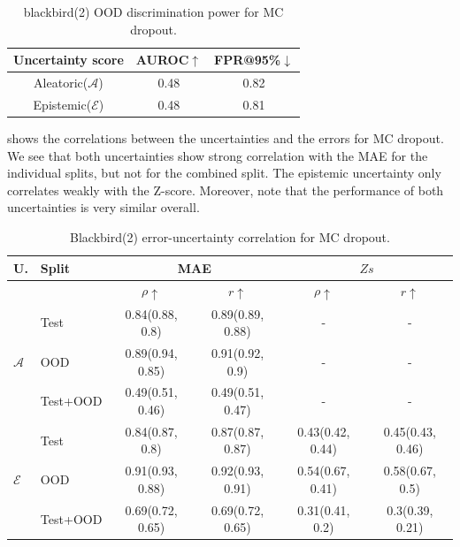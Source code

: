 \begin{table}[h]
\centering
    \begin{tabular}{c  c  c}  
        \toprule
        Uncertainty score & AUROC$\uparrow$ & FPR@95\%$\downarrow$\\
        \midrule
        Aleatoric($\mathcal{A}$) & 0.48  & 0.82\\
        Epistemic($\mathcal{E}$) & 0.48 &  0.81 \\
        \midrule
    \end{tabular}
    \caption{blackbird(2) OOD discrimination power for MC dropout.}
    \label{tbl:bb2_dropout_discrimination}
\end{table}

 shows the correlations between the uncertainties and the errors for MC dropout. We see that both uncertainties show strong correlation with the MAE for the individual splits, but not for the combined split. The epistemic uncertainty only correlates weakly with the Z-score. Moreover, note that the performance of both uncertainties is very similar overall. 


\begin{table}[h]
\centering
    \begin{tabular}{l l c c c c}  
        \toprule
        U. & Split & \multicolumn{2}{c}{MAE} & \multicolumn{2}{c}{$Zs$}\\
        \midrule
        & & $\rho \uparrow$ & $r \uparrow$ & $\rho \uparrow$ & $r \uparrow$ \\
        \multirow{3}{*}{$\mathcal{A}$} 
            & Test     & 0.84(0.88, 0.8) & 0.89(0.89, 0.88) & - & - \\  
            & OOD      & 0.89(0.94, 0.85) & 0.91(0.92, 0.9) & - & - \\  
            & Test+OOD & 0.49(0.51, 0.46) & 0.49(0.51, 0.47) & - & - \\ 

        \midrule
        \multirow{3}{*}{$\mathcal{E}$} 
            & Test     & 0.84(0.87, 0.8)  & 0.87(0.87, 0.87) & 0.43(0.42, 0.44) & 0.45(0.43, 0.46) \\  
            & OOD      & 0.91(0.93, 0.88) & 0.92(0.93, 0.91) & 0.54(0.67, 0.41) & 0.58(0.67, 0.5) \\
            & Test+OOD & 0.69(0.72, 0.65) & 0.69(0.72, 0.65) & 0.31(0.41, 0.2) & 0.3(0.39, 0.21) \\ 

        \toprule
    \end{tabular}
    \caption{Blackbird(2) error-uncertainty correlation for MC dropout.}
    \label{tbl:bb2_dropout_corr}
\end{table}

